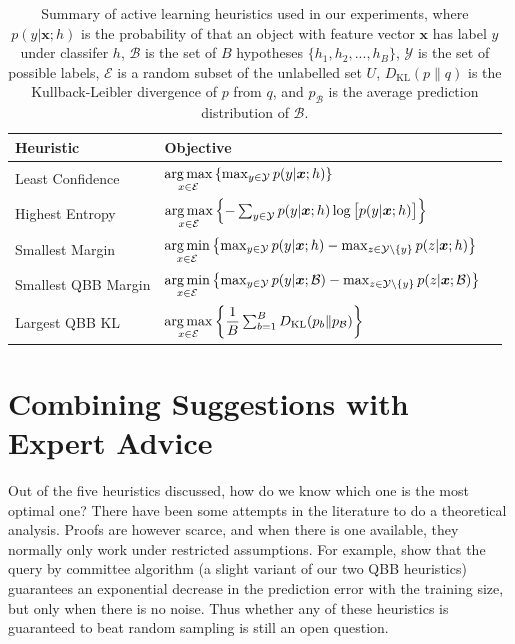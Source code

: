 \documentclass[fleqn,10pt,lineno]{wlpeerj} %
\newcommand{\B}{\mathcal{B}}
\newcommand{\Y}{\mathcal{Y}}
\newcommand{\Ecal}{\mathcal{E}}
\newcommand*{\argmin}{\operatornamewithlimits{arg\,min}\limits}
\newcommand*{\argmax}{\operatornamewithlimits{arg\,max}\limits}
\begin{document}
\begin{table}[h]
	\caption {Summary of active learning heuristics used in our experiments,
			  where $p(y | \bm{x}; h)$ is the probability of that an object
			  with feature vector $\bm{x}$ has label $y$ under classifer $h$,
			  $\B$ is the set of $B$ hypotheses $\{h_1, h_2, ..., h_B\}$,
			  $\Y$ is the set of possible labels, $\Ecal$ is a random subset of
			  the unlabelled set $U$, $D_{\mathrm{KL}}(p\|q)$ is the
			  Kullback-Leibler divergence of $p$ from $q$, and $p_\B$ is the
			  average prediction distribution of $\B$.}
	\label{tab:heuristics}
	\centering
	\begin{tabular}{lll}
		\toprule
		{Heuristic}  &  Objective  \\
		\midrule
        Least Confidence &
			$\argmax_{x \in \Ecal}
			\left\{ \max_{y \in \Y} p(y | \bm{x}; h) \right\}$ \\
		Highest Entropy &
			$\argmax_{x \in \Ecal} \left\{-\sum_{y \in \Y} p(y | \bm{x}; h)
            \log \big[ p(y | \bm{x}; h) \big] \right\}$
			\\[2ex]
		Smallest Margin &
			$\argmin_{x \in \Ecal} \left\{ \max_{y \in \Y} p(y | \bm{x}; h) -
            \max_{z \in \Y \setminus \{y\}} p(z | \bm{x}; h)  \right\}$
			\\[2ex]
		Smallest QBB Margin &
			$\argmin_{x \in \Ecal} \left\{ \max_{y \in \Y} p(y | \bm{x}; \B) -
            \max_{z \in \Y \setminus \{y\}} p(z | \bm{x}; \B)  \right\}$
			\\[2ex]
		Largest QBB KL &
			$\argmax_{x \in \Ecal} \left\{ \dfrac{1}{B}
               \sum_{b=1}^B D_{\mathrm{KL}}(p_b\|p_\B) \right\}$
			\\
		\bottomrule
	\end{tabular}
\end{table}

\section*{Combining Suggestions with Expert Advice}

Out of the five heuristics discussed, how do we know which one is the most
optimal one? There have been some attempts in the literature to do a
theoretical analysis. Proofs are however scarce, and when there is one
available, they normally only work under restricted assumptions. For example,
\cite{freund97} show that the query by committee algorithm (a slight variant of
our two QBB heuristics) guarantees an exponential decrease in the prediction
error with the training size, but only when there is no noise. Thus whether any
of these heuristics is guaranteed to beat random sampling is still an open
question.
\end{document}
